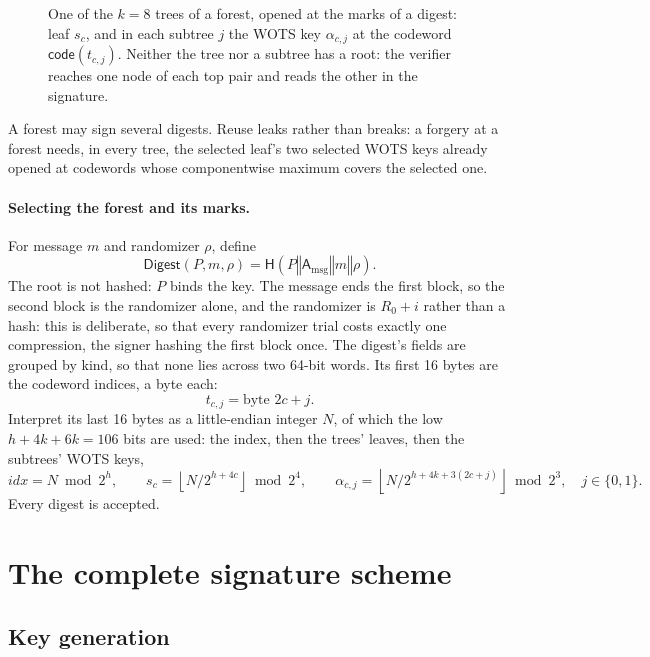 \documentclass[11pt]{article}
\theoremstyle{plain}
\theoremstyle{definition}
\newcommand{\Digest}{\mathsf{Digest}}
\newcommand{\hash}{\mathsf{H}}
\newcommand{\concat}{\mathbin\Vert}
\newcommand{\addr}{\mathsf{A}}
\newcommand{\idx}{\mathit{idx}}
\newcommand{\lut}{\mathsf{code}}
\begin{document}
\begin{figure}[t]
\caption{One of the $k=8$ trees of a forest, opened at the marks of a digest: leaf $s_c$, and in each subtree $j$ the WOTS key $\alpha_{c,j}$ at the codeword $\lut(t_{c,j})$. Neither the tree nor a subtree has a root: the verifier reaches one node of each top pair and reads the other in the signature.}
\label{fig:forest}
\end{figure}

A forest may sign several digests. Reuse leaks rather than breaks: a forgery at a forest needs, in every tree, the selected leaf's two selected WOTS keys already opened at codewords whose componentwise maximum covers the selected one.

\paragraph{Selecting the forest and its marks.}
\label{rem:rho}
For message $m$ and randomizer $\rho$, define
\[
  \Digest(P,m,\rho)=\hash(P\concat\addr_{\mathrm{msg}}\concat m\concat\rho).
\]
The root is not hashed: $P$ binds the key. The message ends the first block, so the second block is the randomizer alone, and the randomizer is $R_0+i$ rather than a hash: this is deliberate, so that every randomizer trial costs exactly one compression, the signer hashing the first block once. The digest's fields are grouped by kind, so that none lies across two 64-bit words. Its first 16 bytes are the codeword indices, a byte each:
\[
  t_{c,j}=\text{byte }2c+j.
\]
Interpret its last 16 bytes as a little-endian integer $N$, of which the low $h+4k+6k=106$ bits are used: the index, then the trees' leaves, then the subtrees' WOTS keys,
\[
  \idx=N\bmod2^h,\qquad
  s_c=\left\lfloor N/2^{h+4c}\right\rfloor\bmod2^4,\qquad
  \alpha_{c,j}=\left\lfloor N/2^{h+4k+3(2c+j)}\right\rfloor\bmod2^3,
  \quad j\in\{0,1\}.
\]
Every digest is accepted.

\section{The complete signature scheme}

\subsection{Key generation}
\label{rem:seed}
\end{document}

